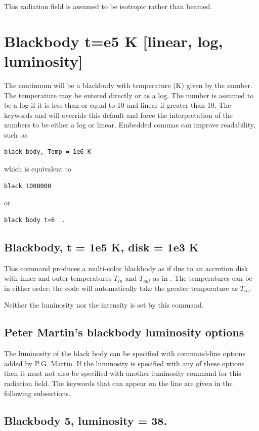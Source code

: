 This radiation field is assumed to be isotropic rather than beamed.

\section{Blackbody t=e5 K [linear, log, luminosity]}

The continuum will be a blackbody with temperature (K) given by the
number.
The temperature may be entered directly or as a log.
The number
is assumed to be a log if it is less than or equal to 10 and linear if
greater than 10.
The keywords  and  will override
this default
and force the interpretation of the numbers to be either a log or linear.
Embedded commas can improve readability, such~as
\begin{verbatim}
black body, Temp = 1e6 K
\end{verbatim}
which is equivalent to
\begin{verbatim}
black 1000000
\end{verbatim}
or
\begin{verbatim}
black body t=6  .
\end{verbatim}

\subsection{Blackbody, t = 1e5 K, disk = 1e3 K}

This command produces a multi-color blackbody as if due to an accretion disk  with
inner and outer temperatures $T_{in}$ and $T_{out}$ as in \citet{Mitsuda1984}.  
The temperatures can be in either order; the code will automatically take the 
greater temperature as $T_{in}$.  

Neither the luminosity nor the intensity is set by this command.

\subsection{Peter Martin's blackbody luminosity options}

The luminosity of the black body can be specified with command-line
options added by P.G. Martin.
If the luminosity is specified
with any of these options then it must not also be specified with another
luminosity command for this radiation field.
The keywords that can appear
on the line are given in the following subsections.

\subsection{Blackbody 5, luminosity = 38.   }

